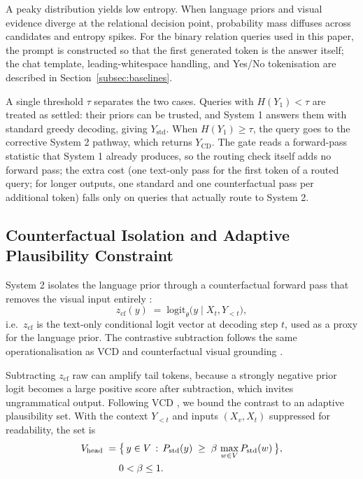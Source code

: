 \documentclass{ieeeaccess}
\begin{document}
A peaky distribution yields low entropy. When language priors and visual evidence diverge at the relational decision point, probability mass diffuses across candidates and entropy spikes. For the binary relation queries used in this paper, the prompt is constructed so that the first generated token is the answer itself; the chat template, leading-whitespace handling, and Yes/No tokenisation are described in Section~\ref{subsec:baselines}.

A single threshold $\tau$ separates the two cases. Queries with $H(Y_{1}) < \tau$ are treated as settled: their priors can be trusted, and System 1 answers them with standard greedy decoding, giving $Y_{\text{std}}$. When $H(Y_{1}) \geq \tau$, the query goes to the corrective System 2 pathway, which returns $Y_{\text{CD}}$. The gate reads a forward-pass statistic that System 1 already produces, so the routing check itself adds no forward pass; the extra cost (one text-only pass for the first token of a routed query; for longer outputs, one standard and one counterfactual pass per additional token) falls only on queries that actually route to System 2.

\subsection{Counterfactual Isolation and Adaptive Plausibility Constraint}\label{subsec:apc}

System 2 isolates the language prior through a counterfactual forward pass that removes the visual input entirely \cite{favero2024multi}:
\begin{equation}\label{eq:cf}
z_{\text{cf}}(y) \;=\; \text{logit}_{\theta}\bigl(y \mid X_{t}, Y_{<t}\bigr),
\end{equation}
i.e.\ $z_{\text{cf}}$ is the text-only conditional logit vector at decoding step $t$, used as a proxy for the language prior. The contrastive subtraction follows the same operationalisation as VCD \cite{leng2024mitigating} and counterfactual visual grounding \cite{favero2024multi}.

Subtracting $z_{\text{cf}}$ raw can amplify tail tokens, because a strongly negative prior logit becomes a large positive score after subtraction, which invites ungrammatical output. Following VCD \cite{leng2024mitigating}, we bound the contrast to an adaptive plausibility set. With the context $Y_{<t}$ and inputs $(X_{v}, X_{t})$ suppressed for readability, the set is
\begin{align}\label{eq:head}
V_{\text{head}} \;=\;& \bigl\{\, y \in V \,:\, P_{\text{std}}(y) \;\geq\; \beta\, \max_{w \in V} P_{\text{std}}(w)\,\bigr\},\notag\\
& 0 < \beta \leq 1.
\end{align}
\end{document}
